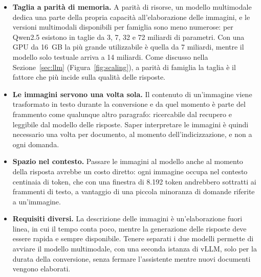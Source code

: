 \begin{itemize}
  \item \textbf{Taglia a parità di memoria.} A parità di risorse, un modello multimodale dedica una parte della
  propria capacità all'elaborazione delle immagini, e le versioni multimodali disponibili per famiglia sono meno
  numerose: per Qwen2.5 esistono in taglie da 3, 7, 32 e 72 miliardi di parametri. Con una GPU da 16~GB la più grande
  utilizzabile è quella da 7 miliardi, mentre il modello solo testuale arriva a 14 miliardi. Come discusso nella
  Sezione~\ref{sec:llm} (Figura~\ref{fig:scaling}), a parità di famiglia la taglia è il fattore che più incide sulla qualità delle risposte.
  \item \textbf{Le immagini servono una volta sola.} Il contenuto di un'immagine viene trasformato in testo durante
  la conversione e da quel momento è parte del frammento come qualunque altro paragrafo: ricercabile dal recupero e
  leggibile dal modello delle risposte. Saper interpretare le immagini è quindi necessario una volta per documento,
  al momento dell'indicizzazione, e non a ogni domanda.
  \item \textbf{Spazio nel contesto.} Passare le immagini al modello anche al momento della risposta avrebbe un costo
  diretto: ogni immagine occupa nel contesto centinaia di token, che con una finestra di 8.192 token andrebbero
  sottratti ai frammenti di testo, a vantaggio di una piccola minoranza di domande riferite a un'immagine.
  \item \textbf{Requisiti diversi.} La descrizione delle immagini è un'elaborazione fuori linea, in cui il tempo
  conta poco, mentre la generazione delle risposte deve essere rapida e sempre disponibile. Tenere separati i due
  modelli permette di avviare il modello multimodale, con una seconda istanza di vLLM, solo per la durata della
  conversione, senza fermare l'assistente mentre nuovi documenti vengono elaborati.
\end{itemize}


